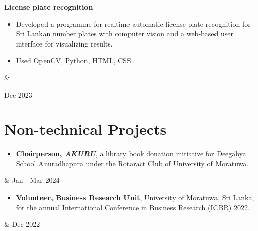 \documentclass[10pt, a4paper]{article}
\newenvironment{highlights}{
        \begin{itemize}[
                topsep=0pt,
                parsep=0.10 cm,
                partopsep=0pt,
                itemsep=0pt,
                after=\vspace{-1\baselineskip},
                leftmargin=0.4 cm + 3pt
            ]
    }{
        \end{itemize}
    } %
\let\originalTabularx\tabularx
\let\originalEndTabularx\endtabularx
\renewenvironment{tabularx}{\bgroup\centering\originalTabularx}{\originalEndTabularx\par\egroup}
\begin{document}
        \vspace{0.2 cm}
        \begin{tabularx}{
            \textwidth-0.4 cm-0.13cm
        }{
            K{0.2 cm}
            R{4.1 cm}
        }
            \textbf{License plate recognition}

            \vspace{0.10 cm}

            \begin{highlights}
                \item Developed a programme for realtime automatic license plate recognition for Sri Lankan number plates with computer vision and a web-based user interface for visualizing results.
                \item Used OpenCV, Python, HTML, CSS.
            \end{highlights}
            &
            

            Dec 2023
        \end{tabularx}


        \vspace{0.2 cm}
        
        
	\section{Non-technical Projects}
	
	\begin{tabularx}{
            \textwidth-0.4 cm-0.13cm
        }{
            K{0.2 cm}
            R{4.1 cm}
        }
            \begin{highlights}
			\item \textbf{Chairperson, \textit{AKURU}}, a library book donation initiative for Deegabya School Anuradhapura under the Rotaract Club of University of Moratuwa.\end{highlights}
            &
            Jan - Mar 2024
        \end{tabularx}
	\begin{tabularx}{
            \textwidth-0.4 cm-0.13cm
        }{
            K{0.2 cm}
            R{4.1 cm}
        }
            \begin{highlights}
			\item \textbf{Volunteer, Business Research Unit}, University of Moratuwa, Sri Lanka, for the annual International Conference in Business Research (ICBR) 2022. \end{highlights}
            &
            Dec 2022
        \end{tabularx}
\end{document}
